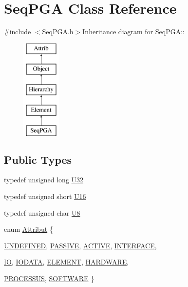 \hypertarget{classSeqPGA}{
\section{SeqPGA Class Reference}
\label{classSeqPGA}
}


{\ttfamily \#include $<$SeqPGA.h$>$}Inheritance diagram for SeqPGA::\begin{figure}[H]
\begin{center}
\leavevmode
\includegraphics[height=5cm]{classSeqPGA}
\end{center}
\end{figure}
\subsection*{Public Types}
\begin{DoxyCompactItemize}
\item 
typedef unsigned long \hyperlink{classSeqPGA_a9e9a99e1d7586223a7c118a19deef42c}{U32}
\item 
typedef unsigned short \hyperlink{classSeqPGA_ab58f68f9484bdc99722a29f533f0d4e3}{U16}
\item 
typedef unsigned char \hyperlink{classSeqPGA_ace27b11f060e537a6fd756cc3eca5347}{U8}
\item 
enum \hyperlink{classAttrib_a69e171d7cc6417835a5a306d3c764235}{Attribut} \{ \par
\hyperlink{classAttrib_a69e171d7cc6417835a5a306d3c764235a3a8da2ab97dda18aebab196fe4100531}{UNDEFINED}, 
\hyperlink{classAttrib_a69e171d7cc6417835a5a306d3c764235a2bfb2af57b87031d190a05fe25dd92ed}{PASSIVE}, 
\hyperlink{classAttrib_a69e171d7cc6417835a5a306d3c764235a3b1fec929c0370d1436f2f06e298fb0d}{ACTIVE}, 
\hyperlink{classAttrib_a69e171d7cc6417835a5a306d3c764235aa27c16b480a369ea4d18b07b2516bbc7}{INTERFACE}, 
\par
\hyperlink{classAttrib_a69e171d7cc6417835a5a306d3c764235a1420a5b8c0540b2af210b6975eded7f9}{IO}, 
\hyperlink{classAttrib_a69e171d7cc6417835a5a306d3c764235a0af3b0d0ac323c1704e6c69cf90add28}{IODATA}, 
\hyperlink{classAttrib_a69e171d7cc6417835a5a306d3c764235a7788bc5dd333fd8ce18562b269c9dab1}{ELEMENT}, 
\hyperlink{classAttrib_a69e171d7cc6417835a5a306d3c764235a61ceb22149f365f1780d18f9d1459423}{HARDWARE}, 
\par
\hyperlink{classAttrib_a69e171d7cc6417835a5a306d3c764235a75250e29692496e73effca2c0330977f}{PROCESSUS}, 
\hyperlink{classAttrib_a69e171d7cc6417835a5a306d3c764235a103a67cd0b8f07ef478fa45d4356e27b}{SOFTWARE}
 \}
\end{DoxyCompactItemize}

